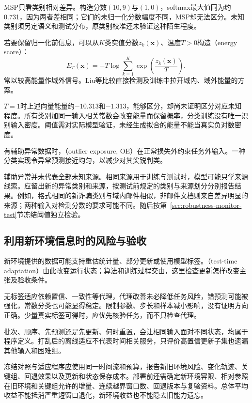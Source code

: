 MSP只看类别相对差异。构造分数$(10,9)$与$(1,0)$，softmax最大值同为约0.731，因为两者差相同；它们的未归一化分数幅度不同，MSP却无法区分。未知类别须另定语义和测试分布，原类别校准还未验证这种陌生程度。

若要保留归一化前信息，可以从$K$类实值分数$z_k(\bm{x})$、温度$T>0$构造（energy score）：
\begin{equation}
 E_T(\bm{x})=-T\log\sum_{k=1}^{K}
       \exp\!\left(\frac{z_k(\bm{x})}{T}\right).
 \label{eq:robustness-energy}
\end{equation}
常以较高能量作域外信号。Liu等比较直接检测及训练中拉开域内、域外能量的方案。

$T=1$时上述向量能量约$-10.313$和$-1.313$，能够区分，却尚未证明区分对应未知程度。所有类别加同一输入相关常数会改变能量而保留概率，分类训练没有唯一识别输入密度。阈值需对实际模型验证，未经生成拟合的能量不能当真实负对数密度。

有辅助异常数据时，（outlier exposure, OE）在正常损失外约束任务外输入。一种分类实现令异常预测接近均匀，以减少对其尖锐判类。

辅助异常并未代表全部未知来源。相同来源用于训练与测试时，模型可能只学来源线索。应留出新的异常类别和来源，按测试前规定的类别与来源划分分别报告结果。例如，格式相同的新诈骗类别与域内邮件相似，非邮件文档则来自差异明显的来源；两种输入对检测分数的要求可能不同。随后按第~\ref{sec:robustness-monitor-test}节冻结阈值独立检验。

\subsection{利用新环境信息时的风险与验收}
\label{sec:robustness-adaptation}

新环境提供的数据可能支持重估统计量、部分更新或使用模型标签。（test-time adaptation）由此改变运行状态；算法和训练过程交由，这里检查更新怎样改变主张及验收条件。

无标签适应依赖置信、一致性等代理，代理改善未必降低任务风险，错预测可能被强化，常数分类也可能显得稳定。限制参数、步长和样本减小影响，没有证明方向正确。少量真实标签可得时，应优先核验任务，而不只检查代理。

批次、顺序、先预测还是先更新、何时重置，会让相同输入面对不同状态，均属于程序定义。打乱后的离线适应不代表时间相关服务，只评价高置信更新子集也遗漏其他输入和困难组。

冻结对照与适应程序应使用同一时间流和预算，报告新旧环境风险、变化轨迹、关键组、回退效果以及更新和状态保存成本。部署前还需确定新环境容限、相对参照在旧环境和关键组允许的增量、连续越界窗口数、回退版本与复验资料。总体平均收益不能抵消严重短窗口退化，新环境收益也不能隐去旧能力遗忘。

